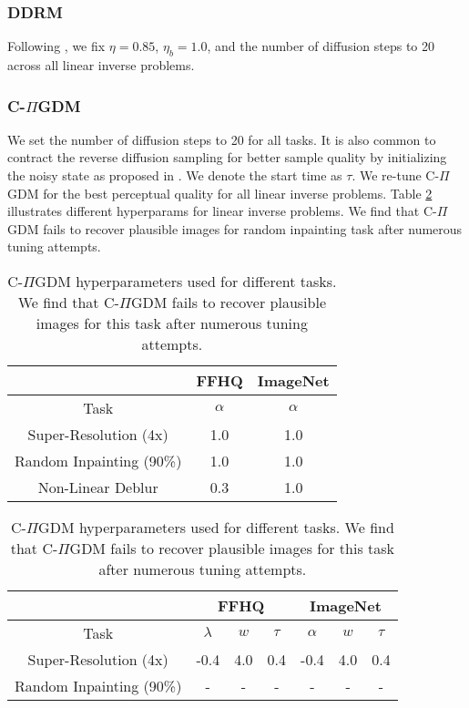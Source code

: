 \subsubsection{DDRM \citep{kawar2022denoising}}
Following \citet{kawar2022denoising}, we fix $\eta = 0.85$, $\eta_b = 1.0$, and the number of diffusion steps to 20 across all linear inverse problems.

\subsubsection{C-$\Pi$GDM \citep{pandey2024fast}} 
We set the number of diffusion steps to 20 for all tasks. It is also common to contract the reverse diffusion sampling for better sample quality by initializing the noisy state as proposed in \citet{chung2022comecloserdiffusefaster}. We denote the start time as $\tau$. We re-tune C-$\Pi$GDM for the best perceptual quality for all linear inverse problems. Table \ref{table:cpigdm_hparams} illustrates different hyperparams for linear inverse problems. We find that C-$\Pi$GDM fails to recover plausible images for random inpainting task after numerous tuning attempts.

\begin{table}[]
\centering
\begin{minipage}{0.45\textwidth}
    \caption{DPS hyperparameters used for different tasks}
    \centering
    \begin{tabular}{@{}ccc@{}}
    \toprule
                             & FFHQ      & ImageNet  \\ \midrule
    Task                     & $\alpha$  & $\alpha$  \\ \midrule
    Super-Resolution (4x)    &   1.0        & 1.0      \\
    Random Inpainting (90\%) & 1.0        & 1.0        \\
    Non-Linear Deblur        & 0.3 & 1.0 \\ \bottomrule
    \end{tabular}
    \label{table:dps_hparams}
\end{minipage}%
\hfill
\begin{minipage}{0.52\textwidth}
    \centering
    \caption{C-$\Pi$GDM hyperparameters used for different tasks. We find that C-$\Pi$GDM fails to recover plausible images for this task after numerous tuning attempts.}
    \begin{tabular}{@{}ccccccc@{}}
    \toprule
                             & \multicolumn{3}{c}{FFHQ} & \multicolumn{3}{c}{ImageNet} \\ \midrule
    Task                     & $\lambda$ & $w$ & $\tau$ & $\alpha$   & $w$   & $\tau$  \\ \midrule
    Super-Resolution (4x)    & -0.4      & 4.0 & 0.4    & -0.4       & 4.0   & 0.4     \\ \midrule
    Random Inpainting (90\%) & -         & -   & -      & -          & -     & -       \\ \bottomrule
    \end{tabular}
    \label{table:cpigdm_hparams}
\end{minipage}
\end{table}

